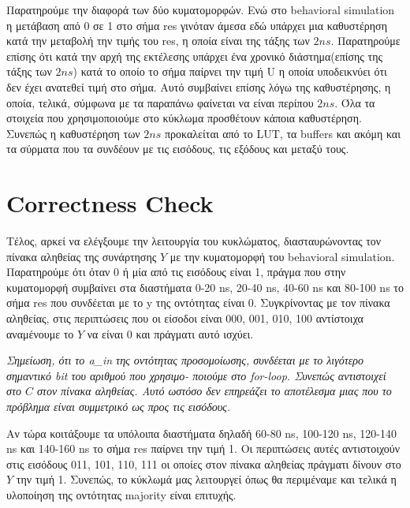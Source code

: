 \documentclass[]{article}
\begin{document}
Παρατηρούμε την διαφορά των δύο κυματομορφών. Ενώ στο behavioral simulation η μετάβαση από 0 σε 1 στο σήμα res γινόταν άμεσα εδώ
υπάρχει μια καθυστέρηση κατά την μεταβολή την τιμής του res, η οποία είναι της τάξης των $2ns$. Παρατηρούμε επίσης ότι κατά την αρχή
της εκτέλεσης υπάρχει ένα χρονικό διάστημα(επίσης της τάξης των $2ns$) κατά το οποίο το σήμα παίρνει την τιμή U η οποία υποδεικνύει ότι δεν έχει ανατεθεί τιμή στο σήμα.
Αυτό συμβαίνει επίσης λόγω της καθυστέρησης, η οποία, τελικά, σύμφωνα με τα παραπάνω φαίνεται να είναι περίπου $2ns$.
Όλα τα στοιχεία που χρησιμοποιούμε στο κύκλωμα προσθέτουν κάποια καθυστέρηση. Συνεπώς η καθυστέρηση των $2ns$ προκαλείται από το LUT, τα buffers και ακόμη και τα σύρματα που τα συνδέουν με τις εισόδους, τις εξόδους και μεταξύ τους.

\section{Correctness Check}
Τέλος, αρκεί να ελέγξουμε την λειτουργία του κυκλώματος, διασταυρώνοντας τον πίνακα αληθείας της συνάρτησης $Y$ με την κυματομορφή του behavioral simulation.
Παρατηρούμε ότι όταν 0 ή μία από τις εισόδους είναι 1, πράγμα που στην κυματομορφή συμβαίνει στα διαστήματα 0-20 ns, 20-40 ns, 40-60 ns και 80-100 ns το σήμα res που συνδέεται με το y της οντότητας είναι 0.
Συγκρίνοντας με τον πίνακα αληθείας, στις περιπτώσεις που οι είσοδοι είναι 000, 001, 010, 100 αντίστοιχα αναμένουμε το $Y$ να είναι 0 και πράγματι αυτό ισχύει.

\textit{Σημείωση, ότι το a\_in της οντότητας προσομοίωσης, συνδέεται με το λιγότερο σημαντικό bit του αριθμού που χρησιμο- ποιούμε στο for-loop.
	Συνεπώς αντιστοιχεί στο $C$ στον πίνακα αληθείας. Αυτό ωστόσο δεν επηρεάζει το αποτέλεσμα μιας που το πρόβλημα είναι συμμετρικό ως προς τις εισόδους.}

Αν τώρα κοιτάξουμε τα υπόλοιπα διαστήματα δηλαδή 60-80 ns, 100-120 ns, 120-140 ns και 140-160 ns το σήμα res παίρνει την τιμή 1.
Οι περιπτώσεις αυτές αντιστοιχούν στις εισόδους 011, 101, 110, 111 οι οποίες στον πίνακα αληθείας πράγματι δίνουν στο $Y$ την τιμή 1.
Συνεπώς, το κύκλωμά μας λειτουργεί όπως θα περιμέναμε και τελικά η υλοποίηση της οντότητας majority είναι επιτυχής.
\end{document}

